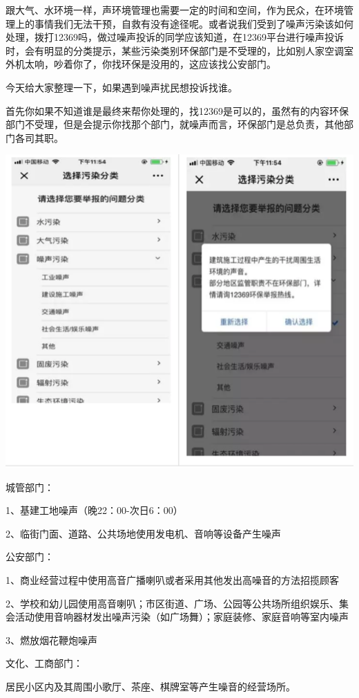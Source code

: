 \documentclass[]{book}
\begin{document}
跟大气、水环境一样，声环境管理也需要一定的时间和空间，作为民众，在环境管理上的事情我们无法干预，自救有没有途径呢。或者说我们受到了噪声污染该如何处理，拨打12369吗，做过噪声投诉的同学应该知道，在12369平台进行噪声投诉时，会有明显的分类提示，某些污染类别环保部门是不受理的，比如别人家空调室外机太响，吵着你了，你找环保是没用的，这应该找公安部门。

今天给大家整理一下，如果遇到噪声扰民想投诉找谁。

首先你如果不知道谁是最终来帮你处理的，找12369是可以的，虽然有的内容环保部门不受理，但是会提示你找那个部门，就噪声而言，环保部门是总负责，其他部门各司其职。

\includegraphics[width=8.33in]{images/zaosheng3}

城管部门：

1、基建工地噪声（晚22：00-次日6：00）

2、临街门面、道路、公共场地使用发电机、音响等设备产生噪声

公安部门：

1、商业经营过程中使用高音广播喇叭或者采用其他发出高噪音的方法招揽顾客

2、学校和幼儿园使用高音喇叭；市区街道、广场、公园等公共场所组织娱乐、集会活动使用音响器材发出噪声污染（如广场舞）；家庭装修、家庭音响等室内噪声

3、燃放烟花鞭炮噪声

文化、工商部门：

居民小区内及其周围小歌厅、茶座、棋牌室等产生噪音的经营场所。
\end{document}
